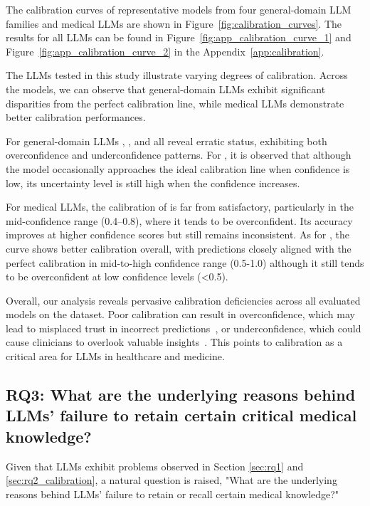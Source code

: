 The calibration curves of representative models from four general-domain LLM families and medical LLMs are shown in Figure~\ref{fig:calibration_curves}. 
The results for all LLMs can be found in Figure~\ref{fig:app_calibration_curve_1} and Figure~\ref{fig:app_calibration_curve_2} in the Appendix~\ref{app:calibration}.

The LLMs tested in this study
illustrate varying degrees of calibration.
Across the models, we can observe that general-domain LLMs exhibit significant disparities from the perfect calibration line, while medical LLMs demonstrate better calibration performances.

For general-domain LLMs \ministral, \qwenc, and \phic all reveal erratic status, exhibiting both overconfidence and underconfidence patterns.
For \llamad, it is observed that although the model occasionally approaches the ideal calibration line when confidence is low, its uncertainty level is still high when the confidence increases.

For medical LLMs, the calibration of \meditron is far from satisfactory, particularly in the mid-confidence range (0.4–0.8), where it tends to be overconfident. Its accuracy improves at higher confidence scores but still remains inconsistent. As for \mellama, the curve shows better calibration overall, with predictions closely aligned with the perfect calibration in mid-to-high confidence range (0.5-1.0) although it still tends to be overconfident at low confidence levels (<0.5). 

Overall, our analysis reveals pervasive calibration deficiencies across all evaluated models on the \mkj dataset. Poor calibration can result in overconfidence, which may lead to misplaced trust in incorrect predictions~\cite{xiong2024can, chen-etal-2023-close}, or underconfidence, which could cause clinicians to overlook valuable insights~\cite{yang2010nurses, jiang2012calibrating}. This points to calibration as a critical area for LLMs in healthcare and medicine.


\subsection{RQ3: What are the underlying reasons behind LLMs’ failure to retain certain critical medical knowledge?}
\label{sec:rq3}

Given that LLMs exhibit problems observed in Section \ref{sec:rq1} and \ref{sec:rq2_calibration}, a natural question is raised, "What are the underlying reasons behind LLMs' failure to retain or recall certain medical knowledge?"

